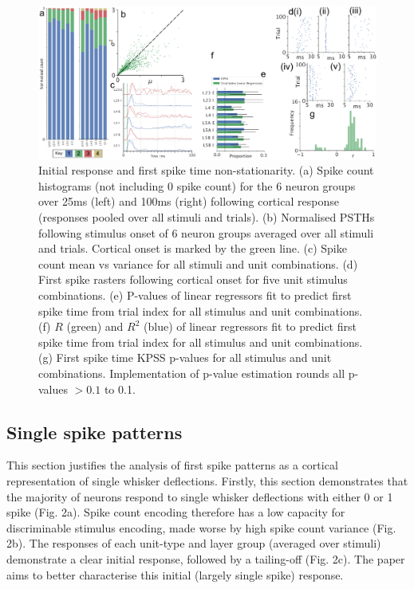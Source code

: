 \documentclass{article}
\begin{document}
\begin{figure}[t!]
\centering
\includegraphics[width=\textwidth]{Figure2.pdf}
\caption{Initial response and first spike time non-stationarity. (a) Spike count histograms (not including 0 spike count) for the 6 neuron groups over 25ms (left) and 100ms (right) following cortical response (responses pooled over all stimuli and trials). (b) Normalised PSTHs following stimulus onset of 6 neuron groups averaged over all stimuli and trials. Cortical onset is marked by the green line. (c) Spike count mean vs variance for all stimuli and unit combinations. (d) First spike rasters following cortical onset for five unit stimulus combinations. (e) P-values of linear regressors fit to predict first spike time from trial index for all stimulus and unit combinations. (f) $R$ (green) and $R^2$ (blue) of linear regressors fit to predict first spike time from trial index for all stimulus and unit combinations. (g) First spike time KPSS p-values for all stimulus and unit combinations. Implementation of p-value estimation rounds all p-values $>0.1$ to 0.1.}
\label{fig:universe}
\end{figure}


\subsection*{Single spike patterns}


This section justifies the analysis of first spike patterns as a cortical representation of single whisker deflections. Firstly, this section demonstrates that the majority of neurons respond to single whisker deflections with either 0 or 1 spike (Fig. 2a). Spike count encoding therefore has a low capacity for discriminable stimulus encoding, made worse by high spike count variance (Fig. 2b). The responses of each unit-type and layer group (averaged over stimuli) demonstrate a clear initial response, followed by a tailing-off (Fig. 2c). The paper aims to better characterise this initial (largely single spike) response.
\end{document}
